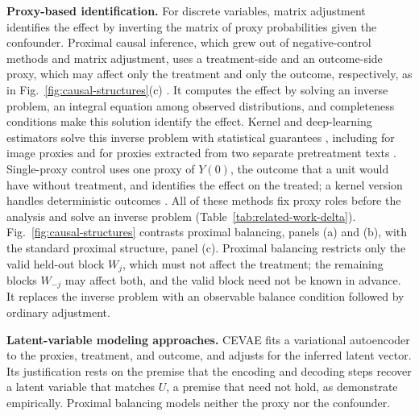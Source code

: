 \textbf{Proxy-based identification.} For discrete variables, matrix adjustment \citep{kuroki2014measurement,lee2021matrix} identifies the effect by inverting the matrix of proxy probabilities given the confounder. Proximal causal inference, which grew out of negative-control methods \citep{lipsitch2010negative} and matrix adjustment, uses a treatment-side and an outcome-side proxy, which may affect only the treatment and only the outcome, respectively, as in Fig.~\ref{fig:causal-structures}(c) \citep{miao2018proxy,tchetgen2024ProximalCausalInference,cui2024semiparametric}. It computes the effect by solving an inverse problem, an integral equation among observed distributions, and completeness conditions make this solution identify the effect. Kernel and deep-learning estimators solve this inverse problem with statistical guarantees \citep{mastouri2021proximal,kallus2021causal}, including for image proxies and for proxies extracted from two separate pretreatment texts \citep{xu2021deep,chen2024proximal}. Single-proxy control \citep{tchetgen2014control,park2024single} uses one proxy of $Y(0)$, the outcome that a unit would have without treatment, and identifies the effect on the treated; a kernel version handles deterministic outcomes \citep{xu2025kernel}. All of these methods fix proxy roles before the analysis and solve an inverse problem (Table~\ref{tab:related-work-delta}). Fig.~\ref{fig:causal-structures} contrasts proximal balancing, panels (a) and (b), with the standard proximal structure, panel (c). Proximal balancing restricts only the valid held-out block $W_j$, which must not affect the treatment; the remaining blocks $W_{-j}$ may affect both, and the valid block need not be known in advance. It replaces the inverse problem with an observable balance condition followed by ordinary adjustment.

\textbf{Latent-variable modeling approaches.} CEVAE \citep{louizos2017causal} fits a variational autoencoder \citep{kingma2014auto} to the proxies, treatment, and outcome, and adjusts for the inferred latent vector. Its justification rests on the premise that the encoding and decoding steps recover a latent variable that matches $U$, a premise that need not hold, as \citet{rissanen2021critical} demonstrate empirically. Proximal balancing models neither the proxy nor the confounder.

